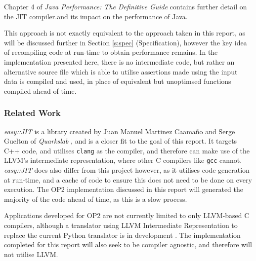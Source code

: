 \noindent Chapter 4 of \textit{Java Performance: The Definitive Guide} \cite{javaPerf} contains further detail on the JIT compiler.and its impact on the performance of Java. 

This approach is not exactly equivalent to the approach taken in this report, as will be discussed further in Section \ref{s:spec} (Specification), however the key idea of recompiling code at run-time to obtain performance remains. In the implementation presented here, there is no intermediate code, but rather an alternative source file which is able to utilise assertions made using the input data is compiled and used, in place of equivalent but unoptimsed functions compiled ahead of time.

\subsubsection{Related Work}

\hspace{\parindent} \textit{easy::JIT} \cite{eJIT} is a library created by Juan Manuel Martinez Caamaño and Serge Guelton of \textit{Quarkslab} \cite{Quarkslab}, and is a closer fit to the goal of this report. It targets C++ code, and utilises \verb|clang| \cite{clang} as the compiler, and therefore can make use of the LLVM's intermediate representation, where other C compilers like \verb|gcc| cannot. \textit{easy::JIT} does also differ from this project however, as it utilises code generation at run-time, and a cache of code to ensure this does not need to be done on every execution. The OP2 implementation discussed in this report will generated the majority of the code ahead of time, as this is a slow process.
\par
Applications developed for OP2 are not currently limited to only LLVM-based C compilers, although a translator using LLVM Intermediate Representation to replace the current Python translator is in development \cite{op2clang}. The implementation completed for this report will also seek to be compiler agnostic, and therefore will not utilise LLVM.
